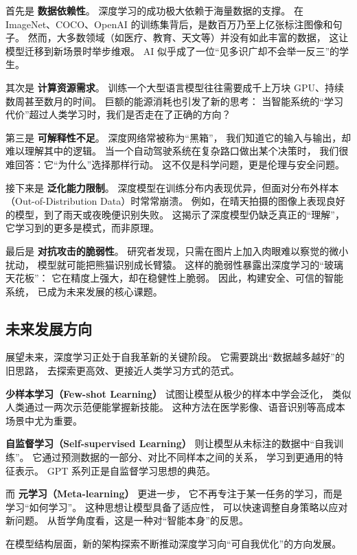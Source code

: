 首先是 {\bf 数据依赖性}。  
深度学习的成功极大依赖于海量数据的支撑。  
在 ImageNet、COCO、OpenAI 的训练集背后，是数百万乃至上亿张标注图像和句子。  
然而，大多数领域（如医疗、教育、天文等）并没有如此丰富的数据，  
这让模型迁移到新场景时举步维艰。  
AI 似乎成了一位“见多识广却不会举一反三”的学生。  

其次是 {\bf 计算资源需求}。  
训练一个大型语言模型往往需要成千上万块 GPU、持续数周甚至数月的时间。  
巨额的能源消耗也引发了新的思考：  
当智能系统的“学习代价”超过人类学习时，我们是否走在了正确的方向？  

第三是 {\bf 可解释性不足}。  
深度网络常被称为“黑箱”，  
我们知道它的输入与输出，却难以理解其中的逻辑。  
当一个自动驾驶系统在复杂路口做出某个决策时，  
我们很难回答：它“为什么”选择那样行动。  
这不仅是科学问题，更是伦理与安全问题。  

接下来是 {\bf 泛化能力限制}。  
深度模型在训练分布内表现优异，但面对分布外样本（Out-of-Distribution Data）时常常崩溃。  
例如，在晴天拍摄的图像上表现良好的模型，到了雨天或夜晚便识别失败。  
这揭示了深度模型仍缺乏真正的“理解”，  
它学习到的更多是模式，而非原理。  

最后是 {\bf 对抗攻击的脆弱性}。  
研究者发现，只需在图片上加入肉眼难以察觉的微小扰动，  
模型就可能把熊猫识别成长臂猿。  
这样的脆弱性暴露出深度学习的“玻璃天花板”：  
它在精度上强大，却在稳健性上脆弱。  
因此，构建安全、可信的智能系统，  
已成为未来发展的核心课题。

\subsection{未来发展方向}

展望未来，深度学习正处于自我革新的关键阶段。  
它需要跳出“数据越多越好”的旧思路，  
去探索更高效、更接近人类学习方式的范式。  

{\bf 少样本学习（Few-shot Learning）} 试图让模型从极少的样本中学会泛化，  
类似人类通过一两次示范便能掌握新技能。  
这种方法在医学影像、语音识别等高成本场景中尤为重要。  

{\bf 自监督学习（Self-supervised Learning）} 则让模型从未标注的数据中“自我训练”。  
它通过预测数据的一部分、对比不同样本之间的关系，  
学习到更通用的特征表示。  
GPT 系列正是自监督学习思想的典范。  

而 {\bf 元学习（Meta-learning）} 更进一步，  
它不再专注于某一任务的学习，而是学习“如何学习”。  
这种思想让模型具备了适应性，  
可以快速调整自身策略以应对新问题。  
从哲学角度看，这是一种对“智能本身”的反思。

在模型结构层面，新的架构探索不断推动深度学习向“可自我优化”的方向发展。  

